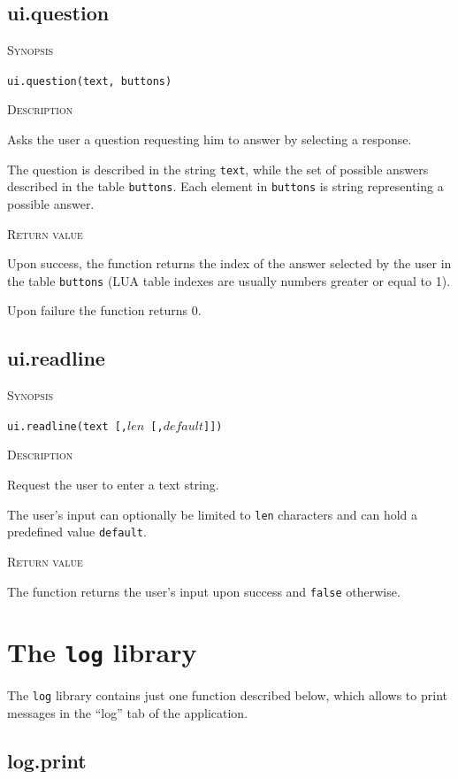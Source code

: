 \documentclass[11pt]{report}
\newcommand{\mansection}[1]{\vspace{0.5em}\par\noindent\textsc{#1}\vspace{0.5em}\par}
\begin{document}
\subsection{ui.question}

\mansection{Synopsis}
\texttt{ui.question(text, buttons)}

\mansection{Description}
  Asks the user a question requesting him to answer by selecting a response.

  The question is described in the string \texttt{text}, while the set of 
  possible answers described in the table \texttt{buttons}. 
  Each element in \texttt{buttons} is string representing a possible answer.
  
\mansection{Return value}
  Upon success, the function returns the index of the answer selected by the 
  user in the table \texttt{buttons} 
  (LUA table indexes are usually numbers greater or equal to 1). 
  
  Upon failure the function returns 0.


\subsection{ui.readline}

\mansection{Synopsis}
\texttt{ui.readline(text [,$len$ [,$default$]])}

\mansection{Description}
  Request the user to enter a text string. 

  The user's input can optionally be limited to \texttt{len} characters and 
  can hold a predefined value \texttt{default}.
  
\mansection{Return value}
  The function returns the user's input upon success and \texttt{false} otherwise.


\section{The \texttt{log} library}

The \texttt{log} library contains just one function described below, which allows to print messages in the ``log'' tab of the application.


\subsection{log.print}
\end{document}
